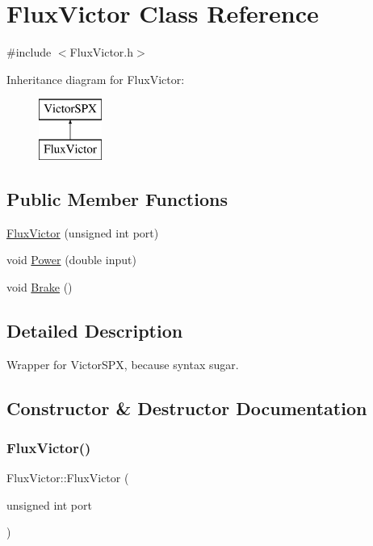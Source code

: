 \hypertarget{classFluxVictor}{}\section{Flux\+Victor Class Reference}
\label{classFluxVictor}


{\ttfamily \#include $<$Flux\+Victor.\+h$>$}

Inheritance diagram for Flux\+Victor\+:\begin{figure}[H]
\begin{center}
\leavevmode
\includegraphics[height=2.000000cm]{classFluxVictor}
\end{center}
\end{figure}
\subsection*{Public Member Functions}
\begin{DoxyCompactItemize}
\item 
\hyperlink{classFluxVictor_aaf6621fe1c9589a10dde59ca9de5a1a0}{Flux\+Victor} (unsigned int port)
\item 
void \hyperlink{classFluxVictor_a84f42f074e9f6d9a3d385f5993e7cc21}{Power} (double input)
\item 
void \hyperlink{classFluxVictor_a6ea20f0e75817153eddf565a33df10c8}{Brake} ()
\end{DoxyCompactItemize}


\subsection{Detailed Description}
Wrapper for Victor\+S\+PX, because syntax sugar. 

\subsection{Constructor \& Destructor Documentation}
\mbox{\label{classFluxVictor_aaf6621fe1c9589a10dde59ca9de5a1a0}} 
\subsubsection{\texorpdfstring{Flux\+Victor()}{FluxVictor()}}
{\footnotesize\ttfamily Flux\+Victor\+::\+Flux\+Victor (\begin{DoxyParamCaption}\item[{unsigned int}]{port }\end{DoxyParamCaption})}



